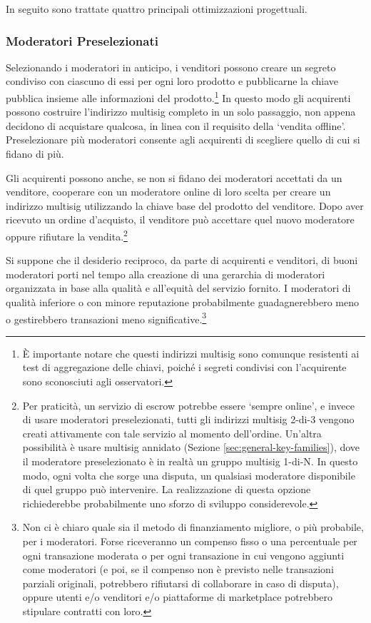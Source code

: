 In seguito sono trattate quattro principali ottimizzazioni progettuali.

\subsubsection*{Moderatori Preselezionati}

Selezionando i moderatori in anticipo, i venditori possono creare un segreto condiviso con ciascuno di essi per ogni loro prodotto e pubblicarne la chiave pubblica insieme alle informazioni del prodotto.\footnote{È importante notare che questi indirizzi multisig sono comunque resistenti ai test di aggregazione delle chiavi, poiché i segreti condivisi con l'acquirente sono sconosciuti agli osservatori.} In questo modo gli acquirenti possono costruire l'indirizzo multisig completo in un solo passaggio, non appena decidono di acquistare qualcosa, in linea con il requisito della `vendita offline'. Preselezionare più moderatori consente agli acquirenti di scegliere quello di cui si fidano di più.

Gli acquirenti possono anche, se non si fidano dei moderatori accettati da un venditore, cooperare con un moderatore online di loro scelta per creare un indirizzo multisig utilizzando la chiave base del prodotto del venditore. Dopo aver ricevuto un ordine d'acquisto, il venditore può accettare quel nuovo moderatore oppure rifiutare la vendita.\footnote{Per praticità, un servizio di escrow potrebbe essere `sempre online', e invece di usare moderatori preselezionati, tutti gli indirizzi multisig 2-di-3 vengono creati attivamente con tale servizio al momento dell'ordine. Un'altra possibilità è usare multisig annidato (Sezione \ref{sec:general-key-families}), dove il moderatore preselezionato è in realtà un gruppo multisig 1-di-N. In questo modo, ogni volta che sorge una disputa, un qualsiasi moderatore disponibile di quel gruppo può intervenire. La realizzazione di questa opzione richiederebbe probabilmente uno sforzo di sviluppo considerevole.}

Si suppone che il desiderio reciproco, da parte di acquirenti e venditori, di buoni moderatori porti nel tempo alla creazione di una gerarchia di moderatori organizzata in base alla qualità e all'equità del servizio fornito. I moderatori di qualità inferiore o con minore reputazione probabilmente guadagnerebbero meno o gestirebbero transazioni meno significative.\footnote{Non ci è chiaro quale sia il metodo di finanziamento migliore, o più probabile, per i moderatori. Forse riceveranno un compenso fisso o una percentuale per ogni transazione moderata o per ogni transazione in cui vengono aggiunti come moderatori (e poi, se il compenso non è previsto nelle transazioni parziali originali, potrebbero rifiutarsi di collaborare in caso di disputa), oppure utenti e/o venditori e/o piattaforme di marketplace potrebbero stipulare contratti con loro.}

